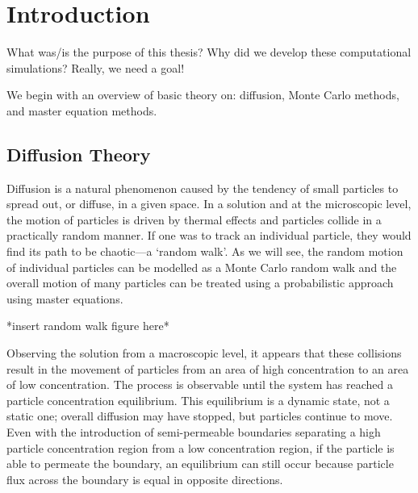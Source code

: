 \chapter{Introduction}
\label{chapter:introduction}

	What was/is the purpose of this thesis? Why did we develop these computational simulations? Really, we need a goal!

%
%

We begin with an overview of basic theory on: diffusion, Monte Carlo methods, and master equation methods.
	
\section{Diffusion Theory}
\label{sec:intro-diffusion}
	Diffusion is a natural phenomenon caused by the tendency of small particles to spread out, or diffuse, in a given space. In a solution and at the microscopic level, the motion of particles is driven by thermal effects and particles collide in a practically random manner. If one was to track an individual particle, they would find its path to be chaotic---a `random walk'. As we will see, the random motion of individual particles can be modelled as a Monte Carlo random walk and the overall motion of many particles can be treated using a probabilistic approach using master equations.
	
	*insert random walk figure here*
	
	Observing the solution from a macroscopic level, it appears that these collisions result in the movement of particles from an area of high concentration to an area of low concentration. The process is observable until the system has reached a particle concentration equilibrium. This equilibrium is a dynamic state, not a static one; overall diffusion may have stopped, but particles continue to move.	Even with the introduction of semi-permeable boundaries separating a high particle concentration region from a low concentration region, if the particle is able to permeate the boundary, an equilibrium can still occur because particle flux across the boundary is equal in opposite directions.
	
